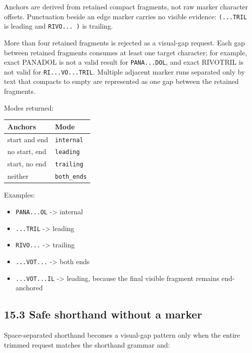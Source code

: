 Anchors are derived from retained compact fragments, not raw marker character
offsets. Punctuation beside an edge marker carries no visible evidence:
\texttt{(...TRIL} is leading and \texttt{RIVO...\ )} is trailing.

More than four retained fragments is rejected as a visual-gap request. Each gap between retained fragments consumes at least one target character; for example, exact PANADOL is not a valid result for \texttt{PANA...DOL}, and exact RIVOTRIL is not valid for \texttt{RI...VO...TRIL}. Multiple adjacent marker runs separated only by text that compacts to empty are represented as one gap between the retained fragments.

Modes returned:

{\def\LTcaptype{none} %
\begin{longtable}[]{@{}>{\RaggedRight\arraybackslash}p{.27\linewidth}>{\RaggedRight\arraybackslash}p{.66\linewidth}@{}}
\toprule\noalign{}
Anchors & Mode \\
\midrule\noalign{}
\endhead
\bottomrule\noalign{}
\endlastfoot
start and end & \texttt{internal} \\
no start, end & \texttt{leading} \\
start, no end & \texttt{trailing} \\
neither & \texttt{both\_\allowbreak{}ends} \\
\end{longtable}
}

Examples:

\begin{itemize}
\tightlist
\item
  \texttt{PANA...OL} -\textgreater{} internal
\item
  \texttt{...TRIL} -\textgreater{} leading
\item
  \texttt{RIVO...} -\textgreater{} trailing
\item
  \texttt{...VOT...} -\textgreater{} both ends
\item
  \texttt{...VOT...IL} -\textgreater{} leading, because the final visible fragment remains end-anchored
\end{itemize}

\subsection{15.3 Safe shorthand without a marker}\label{153-safe-shorthand-without-a-marker}

Space-separated shorthand becomes a visual-gap pattern only when the entire
trimmed request matches the shorthand grammar and:

